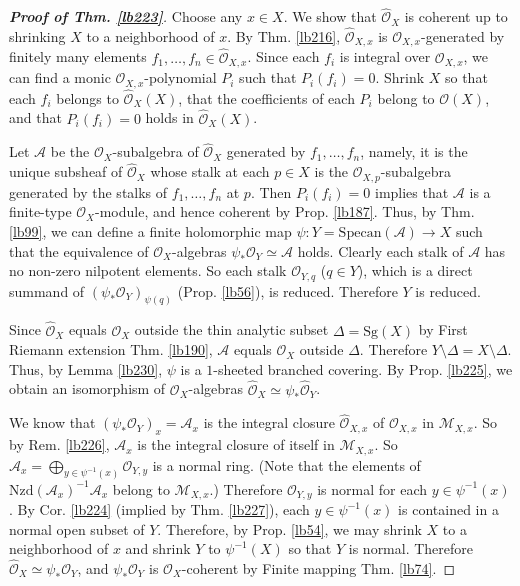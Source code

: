 \documentclass[12pt,b5paper,notitlepage]{report}
\theoremstyle{definition}
\theoremstyle{plain}
\newcommand{\scr}{\mathscr}
\newcommand{\Specan}{\mathrm{Specan}}
\newcommand{\Sg}{\mathrm{Sg}}
\newcommand{\Nzd}{\mathrm{Nzd}}
\newcommand{\Owht}{\widehat{\scr O}}
\numberwithin{equation}{section}
\begin{document}
\begin{proof}[\textbf{Proof of Thm. \ref{lb223}}]
Choose any $x\in X$. We show that $\Owht_X$ is coherent up to shrinking $X$ to a neighborhood of $x$. By Thm. \ref{lb216}, $\Owht_{X,x}$ is $\scr O_{X,x}$-generated by finitely many elements $f_1,\dots,f_n\in\Owht_{X,x}$. Since each $f_i$ is integral over $\scr O_{X,x}$, we can find a monic $\scr O_{X,x}$-polynomial $P_i$ such that $P_i(f_i)=0$. Shrink $X$ so that each $f_i$ belongs to $\Owht_X(X)$, that the coefficients of each $P_i$ belong to $\scr O(X)$, and that $P_i(f_i)=0$ holds in $\Owht_X(X)$.

Let $\scr A$ be the $\scr O_X$-subalgebra of $\Owht_X$ generated by $f_1,\dots,f_n$, namely, it is the unique subsheaf of $\Owht_X$ whose stalk at each $p\in X$ is the $\scr O_{X,p}$-subalgebra generated by the stalks of $f_1,\dots,f_n$ at $p$. Then $P_i(f_i)=0$ implies that $\scr A$ is a finite-type $\scr O_X$-module, and hence coherent by Prop. \ref{lb187}. Thus, by Thm. \ref{lb99}, we can define a finite holomorphic map $\psi:Y=\Specan(\scr A)\rightarrow X$ such that the equivalence of $\scr O_X$-algebras $\psi_*\scr O_Y\simeq \scr A$ holds. Clearly each stalk of $\scr A$ has no non-zero nilpotent elements. So each stalk $\scr O_{Y,q}$ ($q\in Y$), which is a direct summand of $(\psi_*\scr O_Y)_{\psi(q)}$ (Prop. \ref{lb56}), is reduced. Therefore $Y$ is reduced.

Since $\Owht_X$ equals $\scr O_X$ outside the thin analytic subset $\Delta=\Sg(X)$ by First Riemann extension Thm. \ref{lb190}, $\scr A$ equals $\scr O_X$ outside $\Delta$. Therefore $Y\setminus \Delta=X\setminus\Delta$. Thus, by Lemma \ref{lb230}, $\psi$ is a $1$-sheeted branched covering. By Prop. \ref{lb225}, we obtain an isomorphism of $\scr O_X$-algebras $\Owht_X\simeq\psi_*\Owht_Y$.


We know that $(\psi_*\scr O_Y)_x=\scr A_x$ is the integral closure $\Owht_{X,x}$ of $\scr O_{X,x}$ in $\scr M_{X,x}$. So by Rem. \ref{lb226}, $\scr A_x$ is the integral closure of itself in $\scr M_{X,x}$. So $\scr A_x=\bigoplus_{y\in\psi^{-1}(x)}\scr O_{Y,y}$ is a normal ring. (Note that the elements of $\Nzd(\scr A_x)^{-1}\scr A_x$ belong to $\scr M_{X,x}$.) Therefore $\scr O_{Y,y}$ is normal for each $y\in \psi^{-1}(x)$. By Cor. \ref{lb224} (implied by Thm. \ref{lb227}), each $y\in\psi^{-1}(x)$ is contained in a normal open subset of $Y$. Therefore, by Prop. \ref{lb54}, we may shrink $X$ to a neighborhood of $x$ and shrink $Y$ to $\psi^{-1}(X)$ so that $Y$ is normal. Therefore $\Owht_X\simeq\psi_*\scr O_Y$, and $\psi_*\scr O_Y$ is $\scr O_X$-coherent by Finite mapping Thm. \ref{lb74}.
\end{proof}
\end{document}
